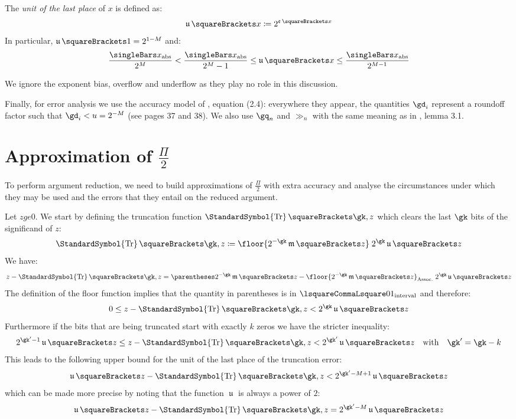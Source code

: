 \documentclass[10pt, a4paper, twoside]{basestyle}
\DeclareMathOperator{\ULP}{\mathfrak u}
\DeclareMathOperator{\mant}{\mathfrak m}
\DeclareMathOperator{\expn}{\mathfrak e}
\DeclareMathOperator{\truncate}{\StandardSymbol{Tr}}
\begin{document}
The \emph{unit of the last place} of $x$ is defined as:
\[
\ULP\of{x} \DefineAs 2^{\expn\of{x}}
\]
In particular, $\ULP\of{1} = 2^{1 - M}$ and:
\begin{equation}
\frac{\abs x}{2^M} < \frac{\abs x}{2^M - 1} \leq \ULP\of{x} \leq \frac{\abs x}{2^{M - 1}}
\label{eqnulp}
\end{equation}

We ignore the exponent bias, overflow and underflow as they play no role in this discussion.

Finally, for error analysis we use the accuracy model of \cite{Higham2002}, equation (2.4): everywhere they appear, the quantities $\gd_i$ represent a roundoff factor such that $\gd_i < u = 2^{-M}$ (see pages 37 and 38).  We also use $\gq_n$ and $\gg_n$ with the same meaning as in \cite{Higham2002}, lemma 3.1.

\section*{Approximation of $\frac{\Pi}{2}$}
To perform argument reduction, we need to build approximations of $\frac{\Pi}{2}$ with extra accuracy and analyse the circumstances under which they may be used and the errors that they entail on the reduced argument.

Let $z ge 0$.  We start by defining the truncation function $\truncate\of{\gk, z}$ which clears the last $\gk$ bits of the significand of $z$:
\[
\truncate\of{\gk, z} \DefineAs \floor{2^{-\gk} \mant \of{z}} \; 2^{\gk} \ULP\of{z}
\]
We have:
\[
z - \truncate\of{\gk, z} = \pa{2^{-\gk} \mant \of{z} - \floor{2^{-\gk} \mant \of{z}}} \; 2^{\gk} \ULP\of{z}
\]
The definition of the floor function implies that the quantity in parentheses is in $\intclop 0 1$ and therefore:
\[
0 \leq z - \truncate\of{\gk, z} < 2^{\gk} \ULP\of{z}
\]
Furthermore if the bits that are being truncated start with exactly $k$ zeros we have the stricter inequality:
\begin{equation}
2^{\gk' - 1} \ULP\of{z} \leq z - \truncate\of{\gk, z} < 2^{\gk'} \ULP\of{z} \quad \text{with} \quad \gk' = \gk - k
\label{eqntruncerror}
\end{equation}
This leads to the following upper bound for the unit of the last place of the truncation error:
\[
\ULP\of{z - \truncate\of{\gk, z}} < 2^{\gk' - M + 1} \ULP\of{z}
\]
which can be made more precise by noting that the function $\ULP$ is always a power of $2$:
\begin{equation}
\ULP\of{z - \truncate\of{\gk, z}} = 2^{\gk' - M} \ULP\of{z}
\label{eqnulptr}
\end{equation}
\end{document}
